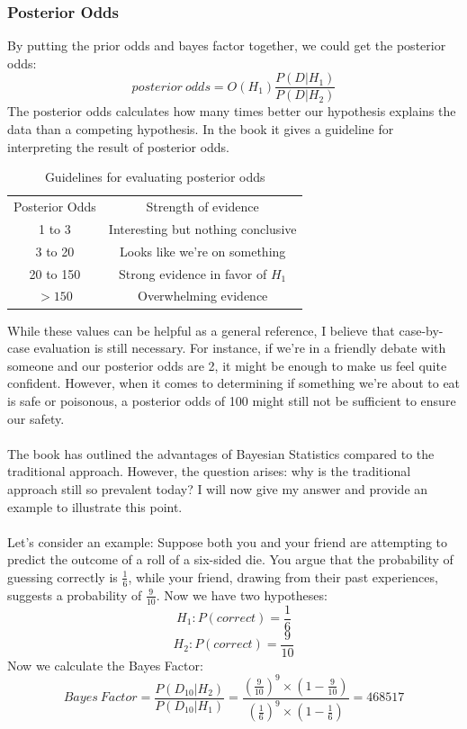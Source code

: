 \documentclass{article}
\begin{document}
\subsubsection{Posterior Odds}
By putting the prior odds and bayes factor together, we could get the posterior odds:
\[posterior\ odds=O(H_1)\frac{P(D|H_1)}{P(D|H_2)}\]
The posterior odds calculates how many times better our hypothesis explains the data than a competing hypothesis. In the book it gives a guideline for interpreting the result of posterior odds.
\begin{table}[!htbp]
    \centering
    \begin{tabular}{cc}
        Posterior Odds & Strength of evidence\\
        1 to 3 & Interesting but nothing conclusive\\
        3 to 20 & Looks like we're on something\\
        20 to 150 & Strong evidence in favor of $H_1$\\
        $>150$ & Overwhelming evidence\\
    \end{tabular}
    \caption{Guidelines for evaluating posterior odds}
    \label{tab:my_label}
\end{table}
\FloatBarrier
While these values can be helpful as a general reference, I believe that case-by-case evaluation is still necessary. For instance, if we're in a friendly debate with someone and our posterior odds are 2, it might be enough to make us feel quite confident. However, when it comes to determining if something we're about to eat is safe or poisonous, a posterior odds of 100 might still not be sufficient to ensure our safety.\\\\
The book has outlined the advantages of Bayesian Statistics compared to the traditional approach. However, the question arises: why is the traditional approach still so prevalent today? I will now give my answer and provide an example to illustrate this point.\\\\
Let's consider an example: Suppose both you and your friend are attempting to predict the outcome of a roll of a six-sided die. You argue that the probability of guessing correctly is $\frac{1}{6}$, while your friend, drawing from their past experiences, suggests a probability of $\frac{9}{10}$. Now we have two hypotheses:
\[H_1:P(correct)=\frac{1}{6}\]
\[H_2:P(correct)=\frac{9}{10}\]
Now we calculate the Bayes Factor:
\[Bayes\ Factor = \frac{P(D_{10}|H_2)}{P(D_{10}|H_1)}=\frac{(\frac{9}{10})^9\times (1-\frac{9}{10})}{(\frac{1}{6})^9\times (1-\frac{1}{6})}=468517\]
\end{document}
